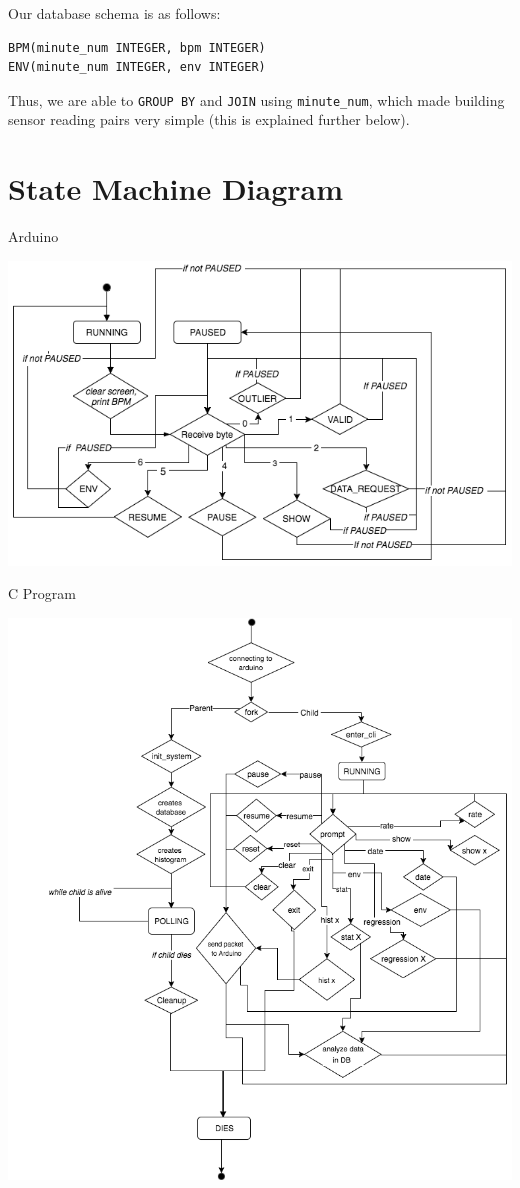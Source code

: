 \documentclass[]{article}
\begin{document}
Our database schema is as follows:

\begin{verbatim}
BPM(minute_num INTEGER, bpm INTEGER)
ENV(minute_num INTEGER, env INTEGER)
\end{verbatim}

Thus, we are able to \texttt{GROUP\ BY} and \texttt{JOIN} using
\texttt{minute\_num}, which made building sensor reading pairs very
simple (this is explained further below).

\section{State Machine Diagram}\label{state-machine-diagram}

Arduino

\newline

\includegraphics{ino.png}

\newpage

C Program

\includegraphics{c.png}
\end{document}
